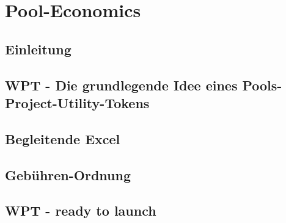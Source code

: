 \documentclass[11pt]{scrartcl}
\begin{document}
\section{Pool-Economics}
\vspace{0.3cm}


\subsection{Einleitung}
\vspace{0.2cm}
\vspace{0.5cm}

\subsection{WPT - Die grundlegende Idee eines Pools-Project-Utility-Tokens}
\label{sec:wpt-design}
\vspace{0.2cm}
%
\vspace{0.5cm}

\subsection{Begleitende Excel}
\label{sec:excel}
\vspace{0.2cm}
\vspace{0.5cm}

\subsection{Gebühren-Ordnung}
\label{sec:fees}
\vspace{0.2cm}

\vspace{0.5cm}


\subsection{WPT - ready to launch}
\label{sec:wpt}
\vspace{0.2cm}
\vspace{0.5cm}


\end{document}
